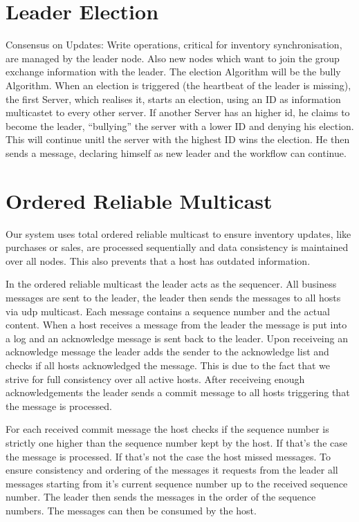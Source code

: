 \section{Leader Election}\label{sec:Election}
Consensus on Updates: Write operations, critical for inventory synchronisation, are managed by the leader node. Also new nodes which want to join the group exchange information with the leader. The election Algorithm will be the bully Algorithm.
When an election is triggered (the heartbeat of the leader is missing), the first Server, which realises it, starts an election, using an ID as information multicastet to every other server. If another Server has an higher id, he claims to become the leader,
\enquote{bullying} the server with a lower ID and denying his election. This will continue unitl the server with the highest ID wins the election. He then sends a message, declaring himself as new leader and the workflow can continue.

\section{Ordered Reliable Multicast}\label{sec:OrderedReliableMulticast}
Our system uses total ordered reliable multicast to ensure inventory updates, like purchases or sales, are processed sequentially and data consistency is maintained over all nodes. This also prevents that a host has outdated information. 

In the ordered reliable multicast the leader acts as the sequencer. All business messages are sent to the leader, the leader then sends the messages to all hosts via udp multicast. Each message contains a sequence number and the actual content. When a host receives a message from the leader the message is put into a log and an acknowledge message is sent back to the leader. Upon receiveing an acknowledge message the leader adds the sender to the acknowledge list and checks if all hosts acknowledged the message. This is due to the fact that we strive for full consistency over all active hosts. After receiveing enough acknowledgements the leader sends a commit message to all hosts triggering that the message is processed. 

For each received commit message the host checks if the sequence number is strictly one higher than the sequence number kept by the host. 
If that's the case the message is processed.
If that's not the case the host missed messages. To ensure consistency and ordering of the messages it requests from the leader all messages starting from it's current sequence number up to the received sequence number. The leader then sends the messages in the order of the sequence numbers. The messages can then be consumed by the host. 

